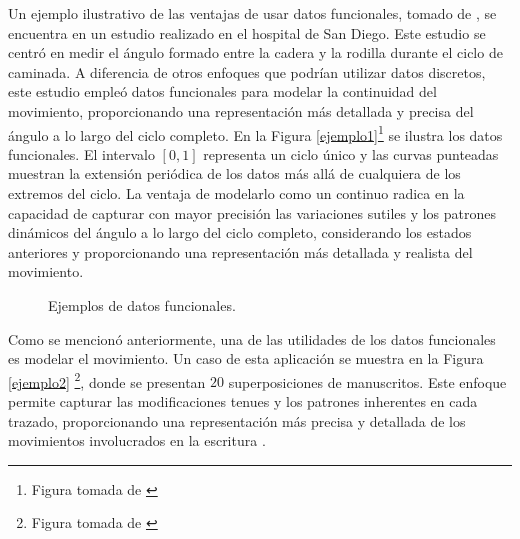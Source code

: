 Un ejemplo ilustrativo de las ventajas de usar datos funcionales, tomado de \cite[Pág. 6]{Ramsay2009}, se encuentra en un estudio realizado en el hospital de San Diego. Este estudio se centró en medir el ángulo formado entre la cadera y la rodilla durante el ciclo de caminada. A diferencia de otros enfoques que podrían utilizar datos discretos, este estudio empleó datos funcionales para modelar la continuidad del movimiento, proporcionando una representación más detallada y precisa del ángulo a lo largo del ciclo completo. En la Figura \ref{ejemplo1}\footnote{Figura tomada de \cite{Ramsay2009}} se ilustra los datos funcionales. El intervalo $[0,1]$ representa un ciclo único y las curvas punteadas muestran la extensión periódica de los datos más allá de cualquiera de los extremos del ciclo. La ventaja de modelarlo como un continuo radica en la capacidad de capturar con mayor precisión las variaciones sutiles y los patrones dinámicos del ángulo a lo largo del ciclo completo, considerando los estados anteriores y proporcionando una representación más detallada y realista del movimiento.

\begin{figure}[H]
 \centering
    \caption{Ejemplos de datos funcionales.}
    \label{fig:fdaEjemplo}
\end{figure}

Como se mencionó anteriormente, una de las utilidades de los datos funcionales es modelar el movimiento. Un caso de esta aplicación se muestra en la Figura \ref{ejemplo2} \footnote{Figura tomada de \cite{Ramsay2009}}, donde se presentan $20$ superposiciones de manuscritos. Este enfoque permite capturar las modificaciones tenues y los patrones inherentes en cada trazado, proporcionando una representación más precisa y detallada de los movimientos involucrados en la escritura \cite[Pág. 8]{Ramsay2009}.

